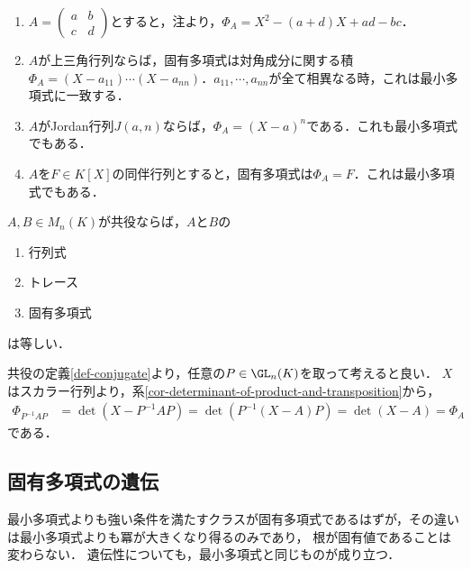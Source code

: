 \documentclass[uplatex, dvipdfmx]{jsreport}
\begin{document}
\begin{example}\mbox{}\label{example-eigenpolynomial}
    \begin{enumerate}
        \item $A=\begin{pmatrix}a&b\\c&d\end{pmatrix}$とすると，注より，$\Phi_A=X^2-(a+d)X+ad-bc$．
        \item $A$が上三角行列ならば，固有多項式は対角成分に関する積$\Phi_A=(X-a_{11})\cdots(X-a_{nn})$．$a_{11},\cdots,a_{nn}$が全て相異なる時，これは最小多項式に一致する．
        \item $A$がJordan行列$J(a,n)$ならば，$\Phi_A=(X-a)^n$である．これも最小多項式でもある．
        \item $A$を$F\in K[X]$の同伴行列とすると，固有多項式は$\Phi_A=F$．これは最小多項式でもある．
    \end{enumerate}
\end{example}

\begin{proposition}\label{prop-行列の特徴量は線型写像について定まっている}
    $A,B\in M_n(K)$が共役ならば，$A$と$B$の
    \begin{enumerate}
        \item 行列式
        \item トレース
        \item 固有多項式
    \end{enumerate}
    は等しい．
\end{proposition}
\begin{Proof}
    共役の定義\ref{def-conjugate}より，任意の$P\in\GL_n(K)$を取って考えると良い．
    $X$はスカラー行列より，系\ref{cor-determinant-of-product-and-transposition}から，
    \begin{align*}
        \Phi_{P^{-1}AP}&=\det(X-P^{-1}AP)=\det(P^{-1}(X-A)P)=\det(X-A)=\Phi_A
    \end{align*}
    である．
\end{Proof}

\subsection{固有多項式の遺伝}

\begin{tcolorbox}[colframe=ForestGreen, colback=ForestGreen!10!white, breakable]
    最小多項式よりも強い条件を満たすクラスが固有多項式であるはずが，その違いは最小多項式よりも冪が大きくなり得るのみであり，
    根が固有値であることは変わらない．
    遺伝性についても，最小多項式と同じものが成り立つ．
\end{tcolorbox}
\end{document}
